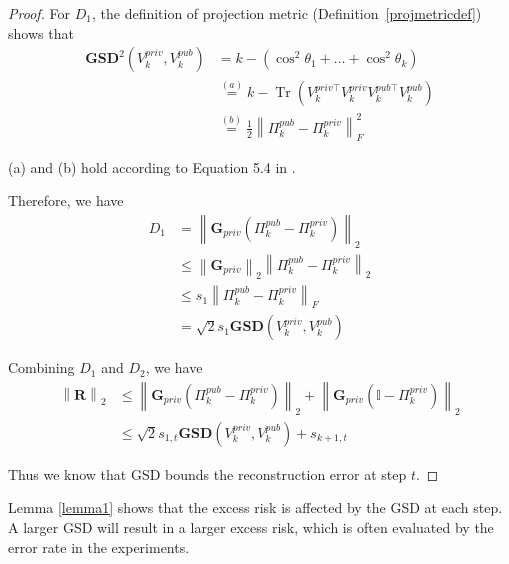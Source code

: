 \documentclass[11pt]{article}
\begin{document}
\begin{proof}
For $D_1$, the definition of projection metric (Definition~\ref{projmetricdef}) shows that
\begin{equation}
\begin{aligned}
    \mathbf{GSD}^2(V_k^{priv}, V_k^{p u b}) & = k - (\cos^2\theta_1 + ... + \cos^2\theta_k) \\
    & \stackrel{(a)}{=} k - \operatorname{Tr}\left( V_k^{priv \top}V_k^{priv}V_k^{p u b \top} V_k^{p u b}\right) \\
    & \stackrel{(b)}{=} \frac{1}{2} \left\| \Pi_k^{pub} - \Pi_k^{priv} \right\|_F^2
\end{aligned}
\end{equation}

(a) and (b) hold according to Equation 5.4 in \cite{projmetric3}.

Therefore, we have
\begin{equation}
\begin{aligned}
    D_1 & = \left\| \mathbf{G}_{p r i v} (\Pi_k^{pub} - \Pi_k^{priv}) \right\|_2 \\
    & \le \left\| \mathbf{G}_{p r i v} \right\|_2 \left\| \Pi_k^{pub} - \Pi_k^{priv} \right\|_2 \\
    & \le s_{1} \left\| \Pi_k^{pub} - \Pi_k^{priv} \right\|_F \\
    & = \sqrt{2}s_{1} \mathbf{GSD}(V_k^{priv}, V_k^{p u b})
\end{aligned}
\end{equation}

Combining $D_1$ and $D_2$, we have
\begin{equation}
\begin{aligned}
\left\| \mathbf{R} \right\|_2 & \le \left\| \mathbf{G}_{p r i v} (\Pi_k^{pub} - \Pi_k^{priv}) \right\|_2 + \left\| \mathbf{G}_{p r i v}\left(\mathbb{I} - \Pi_k^{priv}\right)\right\|_2 \\
& \le \sqrt{2}s_{1, t} \mathbf{GSD}(V_k^{priv}, V_k^{p u b}) + s_{k + 1, t}
\end{aligned}
\end{equation}

Thus we know that GSD bounds the reconstruction error at step $t$.
\end{proof}


Lemma \ref{lemma1} shows that the excess risk is affected by the GSD at each step. A larger GSD will result in a larger excess risk, which is often evaluated by the error rate in the experiments. 
\end{document}
